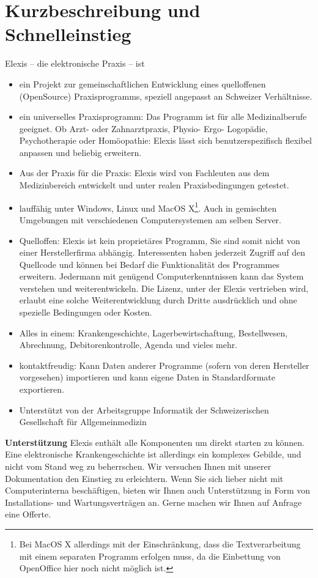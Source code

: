 \documentclass[paper=a4,BCOR8.25mm,twoside]{scrbook}
\begin{document}
\chapter{Kurzbeschreibung und Schnelleinstieg}
Elexis -- die elektronische Praxis -- ist
\begin{itemize}
	\item ein Projekt zur gemeinschaftlichen Entwicklung eines quelloffenen (OpenSource) Praxisprogramms,
speziell angepasst an Schweizer Verhältnisse.
	\item  ein universelles Praxisprogramm:  Das Programm ist für alle Medizinalberufe geeignet. Ob Arzt- oder
Zahnarztpraxis, Physio- Ergo- Logopädie, Psychotherapie oder Homöopathie: Elexis lässt sich benutzerspezifisch
flexibel anpassen und beliebig erweitern.
	\item Aus der Praxis für die Praxis: Elexis wird von Fachleuten aus dem Medizinbereich entwickelt und unter realen Praxisbedingungen getestet.

	\item lauffähig unter Windows, Linux und MacOS X\footnote{Bei MacOS X
	allerdings mit der Einschränkung, dass die Textverarbeitung mit einem separaten
	Programm erfolgen muss, da die Einbettung von OpenOffice hier noch nicht
	möglich ist.}. Auch
	in gemischten Umgebungen mit verschiedenen Computersystemen am selben Server.
	\item Quelloffen: Elexis ist kein proprietäres Programm, Sie sind somit nicht
	von einer Herstellerfirma abhängig. Interessenten haben jederzeit Zugriff auf
	den Quellcode und können bei Bedarf die Funktionalität des Programmes erweitern.
Jedermann mit genügend Computerkenntnissen kann das System verstehen und weiterentwickeln.
Die Lizenz, unter der Elexis vertrieben wird, erlaubt eine solche Weiterentwicklung durch Dritte ausdrücklich
und ohne spezielle Bedingungen oder Kosten.

	\item Alles in einem: Krankengeschichte, Lagerbewirtschaftung,
	Bestellwesen, Abrechnung, Debitorenkontrolle, Agenda und vieles mehr.
  	\item kontaktfreudig: Kann Daten anderer Programme (sofern von deren
 	Hersteller vorgesehen) importieren und kann eigene Daten in Standardformate
 	exportieren.
 	\item Unterstützt von der Arbeitsgruppe Informatik der Schweizerischen
Gesellschaft für Allgemeinmedizin %
\end{itemize}
\pagebreak[3]
\textbf{Unterstützung}
Elexis enthält alle Komponenten um direkt starten zu können.
Eine elektronische Krankengeschichte ist allerdings ein komplexes Gebilde, und nicht vom Stand weg zu
beherrschen. Wir versuchen Ihnen mit unserer Dokumentation den Einstieg zu erleichtern. Wenn Sie sich lieber nicht mit Computerinterna beschäftigen, bieten wir Ihnen auch Unterstützung in Form von Installations- und Wartungsverträgen
an. Gerne machen wir Ihnen auf Anfrage eine Offerte.
\end{document}
